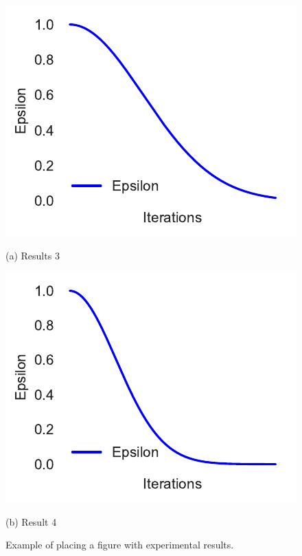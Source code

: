\begin{figure}[htb]
    \begin{minipage}[b]{.48\linewidth}
        \centering
        \centerline{\includegraphics[width=\linewidth]{pommerman/plots/epsilon_8.pdf}}
        \centerline{(a) Results 3}\medskip
    \end{minipage}
    \hfill
    \begin{minipage}[b]{0.48\linewidth}
        \centering
        \centerline{\includegraphics[width=\linewidth]{pommerman/plots/epsilon_20.pdf}}
        \centerline{(b) Result 4}\medskip
    \end{minipage}
    \caption{Example of placing a figure with experimental results.}
    \label{fig:res}
\end{figure}



